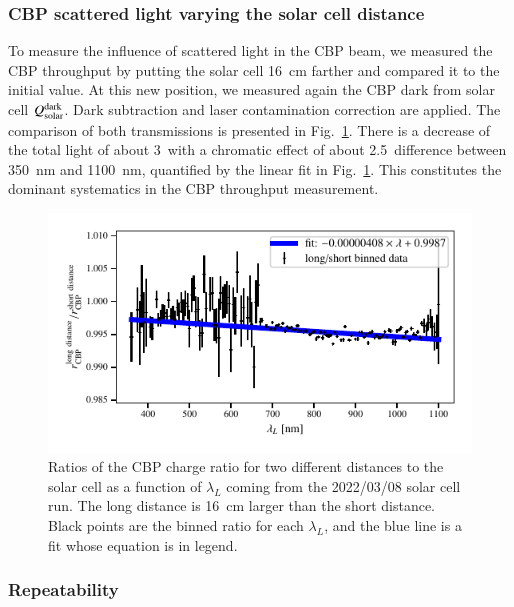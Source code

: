 \subsubsection{CBP scattered light varying the solar cell distance}

To measure the influence of scattered light in the CBP beam, we measured the CBP throughput by putting the solar cell \SI{16}{\cm} farther and compared it to the initial value. At this new position, we measured again the CBP dark from solar cell $Q_{\mathrm{solar}}^{\rm dark}$. Dark subtraction and laser contamination correction are applied. The comparison of both transmissions is presented in Fig.~\ref{fig:sc_distance}. There is a decrease of the total light of about 3\textperthousand\ with a chromatic effect of about 2.5\textperthousand\ difference between \SI{350}{\nano\meter} and \SI{1100}{\nano\meter}, quantified by the linear fit in Fig.~\ref{fig:sc_distance}. This constitutes the dominant systematics in the CBP throughput measurement.

\begin{figure}%
    \centering
    \includegraphics[width=\columnwidth]{fig/sc_distance.pdf}
    \caption{Ratios of the CBP charge ratio for two different distances to the solar cell as a function of $\lambda_L$ coming from the 2022/03/08 solar cell run. The long distance is \SI{16}{\cm} larger than the short distance. Black points are the binned ratio for each $\lambda_L$, and the blue line is a fit whose equation is in legend.}
    \label{fig:sc_distance}
\end{figure}

\subsubsection{Repeatability}

